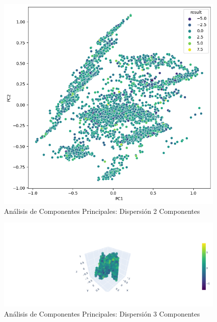 \begin{figure}[H]
    \centering
    \includegraphics[width=\smallSize]{images/scatterPlotPCA2.png}
    \caption{Análisis de Componentes Principales: Dispersión 2 Componentes}
    \label{Conjunto-Datos-Scatter-Plot-2}
\end{figure}

\begin{figure}[H]
    \centering
    \includegraphics[width=\figsize]{images/scatterPlotPCA3.png}
    \caption{Análisis de Componentes Principales: Dispersión 3 Componentes}
    \label{Conjunto-Datos-Scatter-Plot-3}
\end{figure}
